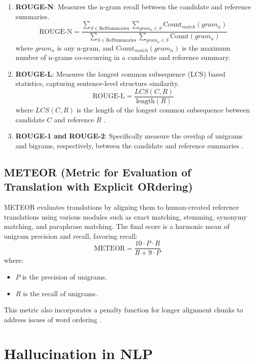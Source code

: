 \begin{enumerate}
    \item \textbf{ROUGE-N}: Measures the n-gram recall between the candidate and reference summaries.
    \[
    \text{ROUGE-N} = \frac{\sum_{S \in \text{RefSummaries}} \sum_{gram_n \in S} \text{Count}_{match}(gram_n)}{\sum_{S \in \text{RefSummaries}} \sum_{gram_n \in S} \text{Count}(gram_n)}
    \]
    where \( gram_n \) is any n-gram, and \( \text{Count}_{match}(gram_n) \) is the maximum number of n-grams co-occurring in a candidate and reference summary.

    \item \textbf{ROUGE-L}: Measures the longest common subsequence (LCS) based statistics, capturing sentence-level structure similarity.
    \[
    \text{ROUGE-L} = \frac{LCS(C, R)}{\text{length}(R)}
    \]
    where \( LCS(C, R) \) is the length of the longest common subsequence between candidate \( C \) and reference \( R \) \cite{Ng2015Better}.

    \item \textbf{ROUGE-1 and ROUGE-2}: Specifically measure the overlap of unigrams and bigrams, respectively, between the candidate and reference summaries \cite{Ganesan2015ROUGE}.
\end{enumerate}

\subsection{METEOR (Metric for Evaluation of Translation with Explicit ORdering)}

METEOR evaluates translations by aligning them to human-created reference translations using various modules such as exact matching, stemming, synonymy matching, and paraphrase matching. The final score is a harmonic mean of unigram precision and recall, favoring recall:
\[
\text{METEOR} = \frac{10 \cdot P \cdot R}{R + 9 \cdot P}
\]
where:
\begin{itemize}
    \item \( P \) is the precision of unigrams.
    \item \( R \) is the recall of unigrams.
\end{itemize}

This metric also incorporates a penalty function for longer alignment chunks to address issues of word ordering \cite{Agarwal2008Meteor}.

\section{Hallucination in NLP}

